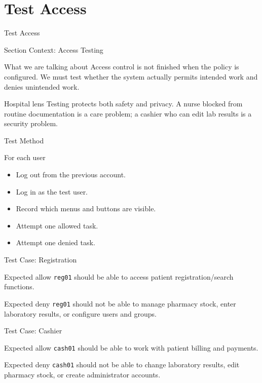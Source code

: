 \documentclass[presentation]{beamer}
\newcommand{\sectiontitleframe}[1]{
\begin{frame}[plain,c]
\begin{center}
{\usebeamerfont{title}\usebeamercolor[fg]{title}#1}
\end{center}
\end{frame}
}
\begin{document}
\section{Test Access}
\sectiontitleframe{Test Access}

\begin{frame}[c]{Section Context: Access Testing}
\begin{block}{What we are talking about}
Access control is not finished when the policy is configured. We must test whether the system
actually permits intended work and denies unintended work.
\end{block}

\begin{exampleblock}{Hospital lens}
Testing protects both safety and privacy. A nurse blocked from routine documentation is a care
problem; a cashier who can edit lab results is a security problem.
\end{exampleblock}
\end{frame}

\begin{frame}[c]{Test Method}
\begin{block}{For each user}
\begin{itemize}
    \item Log out from the previous account.
    \item Log in as the test user.
    \item Record which menus and buttons are visible.
    \item Attempt one allowed task.
    \item Attempt one denied task.
\end{itemize}
\end{block}
\end{frame}

\begin{frame}[c]{Test Case: Registration}
\begin{block}{Expected allow}
\texttt{reg01} should be able to access patient registration/search functions.
\end{block}

\begin{exampleblock}{Expected deny}
\texttt{reg01} should not be able to manage pharmacy stock, enter laboratory results, or configure
users and groups.
\end{exampleblock}
\end{frame}

\begin{frame}[c]{Test Case: Cashier}
\begin{block}{Expected allow}
\texttt{cash01} should be able to work with patient billing and payments.
\end{block}

\begin{exampleblock}{Expected deny}
\texttt{cash01} should not be able to change laboratory results, edit pharmacy stock, or create
administrator accounts.
\end{exampleblock}
\end{frame}
\end{document}
